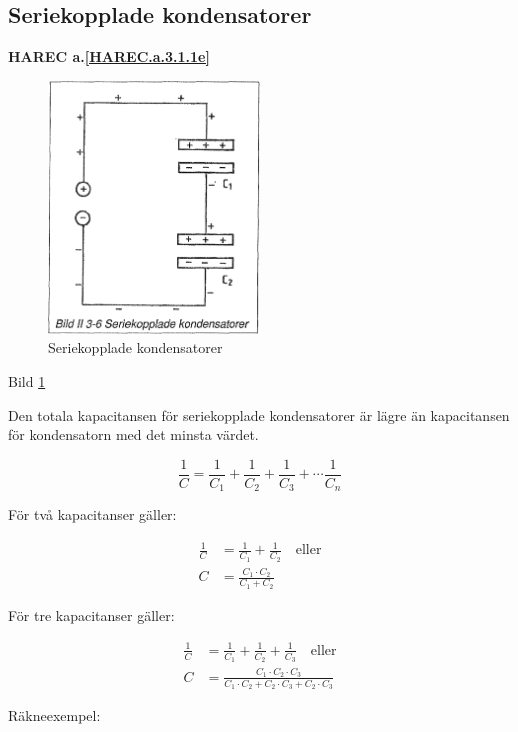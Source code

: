 \subsection{Seriekopplade kondensatorer}
\textbf{HAREC a.\ref{HAREC.a.3.1.1e}\label{myHAREC.a.3.1.1e}}

\begin{figure}
\includegraphics[width=0.5\textwidth]{images/bild_2_3-06}
\caption{Seriekopplade kondensatorer}
\label{fig:BildII3-06}
\end{figure}

Bild \ref{fig:BildII3-06}

Den totala kapacitansen för seriekopplade kondensatorer är lägre än kapacitansen
för kondensatorn med det minsta värdet.

\[
\frac{1}{C} = \frac{1}{C_1} + \frac{1}{C_2} +
\frac{1}{C_3} + \cdots \frac{1}{C_n}
\]

För två kapacitanser gäller:

\begin{align*}
  \frac{1}{C} &= \frac{1}{C_1} + \frac{1}{C_2} \quad \text{eller} \\
  C &= \frac{C_1 \cdot C_2}{C_1 + C_2}
\end{align*}

För tre kapacitanser gäller:

\begin{align*}
  \frac{1}{C} &= \frac{1}{C_1} + \frac{1}{C_2} + \frac{1}{C_3}
  \quad \text{eller} \\
  C &= \frac{C_1 \cdot C_2 \cdot C_3}
  {C_1 \cdot C_2 + C_2 \cdot C_3 + C_2 \cdot C_3}
\end{align*}

Räkneexempel:

